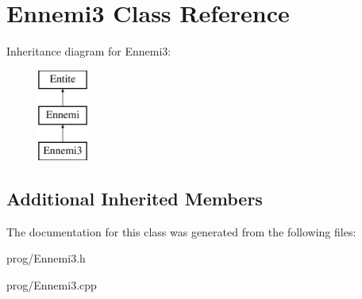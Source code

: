 \hypertarget{class_ennemi3}{}\section{Ennemi3 Class Reference}
\label{class_ennemi3}
Inheritance diagram for Ennemi3\+:\begin{figure}[H]
\begin{center}
\leavevmode
\includegraphics[height=3.000000cm]{class_ennemi3}
\end{center}
\end{figure}
\subsection*{Additional Inherited Members}


The documentation for this class was generated from the following files\+:\begin{DoxyCompactItemize}
\item 
prog/Ennemi3.\+h\item 
prog/Ennemi3.\+cpp\end{DoxyCompactItemize}
